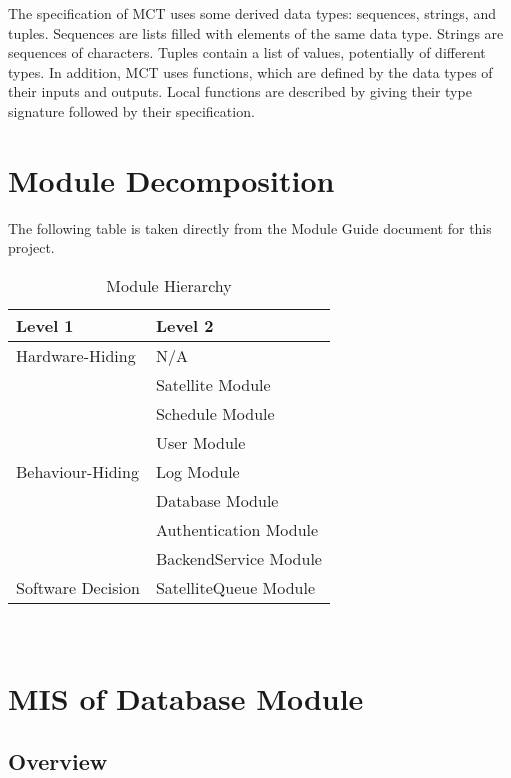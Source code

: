 \documentclass[12pt, titlepage]{article}
\begin{document}
\noindent
The specification of MCT uses some derived data types: sequences, strings, and
tuples. Sequences are lists filled with elements of the same data type. Strings
are sequences of characters. Tuples contain a list of values, potentially of
different types. In addition, MCT  uses functions, which
are defined by the data types of their inputs and outputs. Local functions are
described by giving their type signature followed by their specification.

\section{Module Decomposition}

The following table is taken directly from the Module Guide document for this project.

\begin{table}[h!]
\centering
\begin{tabular}{p{} p{}}
\toprule
\textbf{Level 1} & \textbf{Level 2}\\
\midrule

{Hardware-Hiding} & N/A ~ \\
\midrule

\multirow{7}{0.3\textwidth}{Behaviour-Hiding} & Satellite Module\\
& Schedule Module\\
& User Module\\
& Log Module\\
& Database Module\\
& Authentication Module\\
& BackendService Module \\
\midrule

\multirow{1}{0.3\textwidth}{Software Decision} & SatelliteQueue Module \\
\bottomrule

\end{tabular}
\caption{Module Hierarchy}
\label{TblMH}
\end{table}

\newpage
~\newpage


\section{MIS of Database Module} \label{Module}

\subsection{ Overview}
\end{document}
